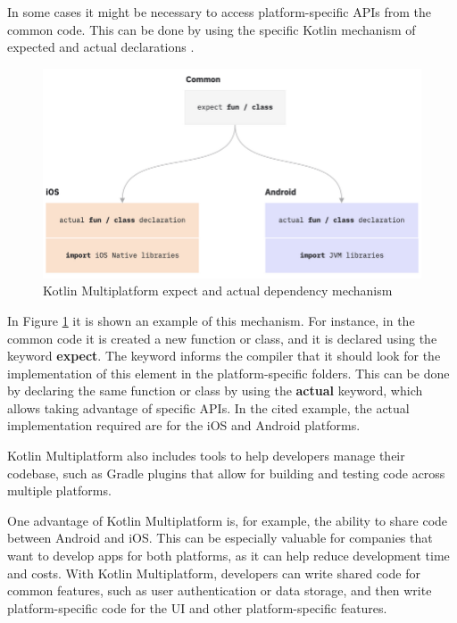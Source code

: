 In some cases it might be necessary to access platform-specific APIs from the common code. This can be done by using the specific Kotlin mechanism of expected and actual declarations \cite{kotlin_multiplatform_expect_actual}.\newline
\begin{figure}[!ht]
    \centering
    \includegraphics[scale=0.85]{document/chapters/4-collektive/images/km_expect_actual.png}
    \caption{Kotlin Multiplatform expect and actual dependency mechanism \cite{kotlin_multiplatform_expect_actual}}
    \label{fig:km_expect_actual}
\end{figure}
In Figure \ref{fig:km_expect_actual} it is shown an example of this mechanism. For instance, in the common code it is created a new function or class, and it is declared using the keyword \textbf{expect}. The keyword informs the compiler that it should look for the implementation of this element in the platform-specific folders. This can be done by declaring the same function or class by using the \textbf{actual} keyword, which allows taking advantage of specific APIs. In the cited example, the actual implementation required are for the iOS and Android platforms.

Kotlin Multiplatform also includes tools to help developers manage their codebase, such as Gradle plugins that allow for building and testing code across multiple platforms.

One advantage of Kotlin Multiplatform is, for example, the ability to share code between Android and iOS. This can be especially valuable for companies that want to develop apps for both platforms, as it can help reduce development time and costs. With Kotlin Multiplatform, developers can write shared code for common features, such as user authentication or data storage, and then write platform-specific code for the UI and other platform-specific features.

